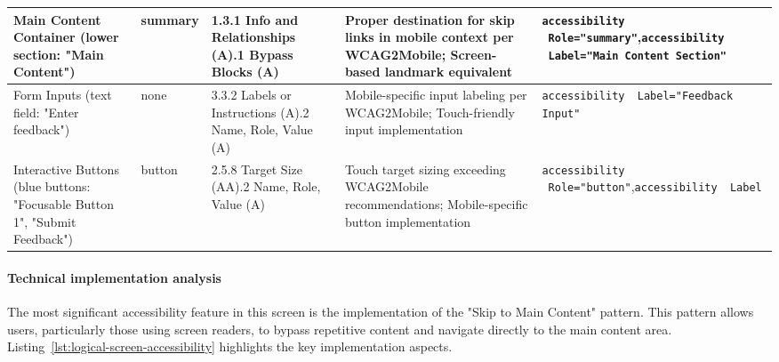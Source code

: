 \begin{longtable}[c]{|C{2.5cm}|C{2cm}|C{2.8cm}|C{3.5cm}|C{4.7cm}|}
\hline
Main Content Container (lower section: "Main Content") & summary & 1.3.1 Info and Relationships (A).1 Bypass Blocks (A) & Proper destination for skip links in mobile context per WCAG2Mobile; Screen-based landmark equivalent & \texttt{accessibility \ Role="summary"},\newline \texttt{accessibility \ Label="Main Content Section"} \\
\hline
Form Inputs (text field: "Enter feedback") & none & 3.3.2 Labels or Instructions (A).2 Name, Role, Value (A) & Mobile-specific input labeling per WCAG2Mobile; Touch-friendly input implementation & \texttt{accessibility \ Label="Feedback Input"} \\
\hline
Interactive Buttons (blue buttons: "Focusable Button 1", "Submit Feedback") & button & 2.5.8 Target Size (AA).2 Name, Role, Value (A) & Touch target sizing exceeding WCAG2Mobile recommendations; Mobile-specific button implementation & \texttt{accessibility \ Role="button"},\newline \texttt{accessibility \ Label} \\
\hline
\end{longtable}
\FloatBarrier

\paragraph{Technical implementation analysis}

The most significant accessibility feature in this screen is the implementation of the "Skip to Main Content" pattern. This pattern allows users, particularly those using screen readers, to bypass repetitive content and navigate directly to the main content area. Listing~\ref{lst:logical-screen-accessibility} highlights the key implementation aspects.

